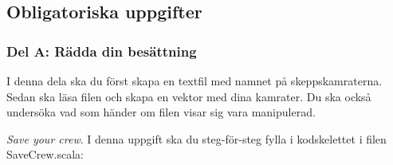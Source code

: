 




\subsection{Obligatoriska uppgifter}

\subsubsection{Del A: Rädda din besättning}

I denna dela ska du först skapa en textfil med namnet på skeppskamraterna. Sedan ska läsa filen och skapa en vektor med dina kamrater. Du ska också undersöka vad som händer om filen visar sig vara manipulerad.

\Task \emph{Save your crew}. I denna uppgift ska du steg-för-steg fylla i kodskelettet i filen SaveCrew.scala:

